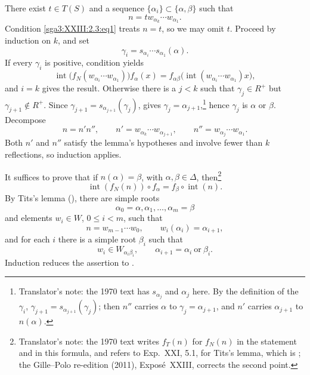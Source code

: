 There exist \(t\in T(S)\) and a sequence
\(\{\alpha_i\}\subset\{\alpha,\beta\}\) such that
\[
  n=tw_{\alpha_k}\cdots w_{\alpha_1}.
\]
Condition \eqref{sga3:XXIII:2.3:eq1} treats \(n=t\), so we may omit
\(t\). Proceed by induction on \(k\), and set
\[
  \gamma_i=s_{\alpha_i}\cdots s_{\alpha_1}(\alpha).
\]
If every \(\gamma_i\) is positive, condition  yields
\[
  \operatorname{int}\bigl(f_N(w_{\alpha_i}\cdots w_{\alpha_1})\bigr)
     f_\alpha(x)
   =
  f_{\alpha\beta}\bigl(
     \operatorname{int}(w_{\alpha_i}\cdots w_{\alpha_1})x\bigr),
\]
and \(i=k\) gives the result. Otherwise there is a \(j<k\) such that
\(\gamma_j\in R^+\) but \(\gamma_{j+1}\notin R^+\). Since
\(\gamma_{j+1}=s_{\alpha_{j+1}}(\gamma_j)\),  gives
\(\gamma_j=\alpha_{j+1}\),\footnote{Translator's note: the 1970 text has \(s_{\alpha_j}\) and
\(\alpha_j\) here. By the definition of the \(\gamma_i\),
\(\gamma_{j+1}=s_{\alpha_{j+1}}(\gamma_j)\); then \(n''\) carries \(\alpha\) to
\(\gamma_j=\alpha_{j+1}\), and \(n'\) carries \(\alpha_{j+1}\) to \(n(\alpha)\).} hence
\(\gamma_j\) is \(\alpha\) or \(\beta\).
Decompose
\[
 n=n'n'',\qquad
 n'=w_{\alpha_k}\cdots w_{\alpha_{j+1}},\qquad
 n''=w_{\alpha_j}\cdots w_{\alpha_1}.
\]
Both \(n'\) and \(n''\) satisfy the lemma's hypotheses and involve
fewer than \(k\) reflections, so induction applies.


It suffices to prove that if \(n(\alpha)=\beta\), with
\(\alpha,\beta\in\Delta\), then\footnote{Translator's note: the 1970 text writes \(f_T(n)\) for
\(f_N(n)\) in the statement and in this formula, and refers to Exp.~XXI, 5.1, for
Tits's lemma, which is ; the Gille--Polo
re-edition (2011), Exposé~XXIII, corrects the second point.}
\[
  \operatorname{int}(f_N(n))\circ f_\alpha
    =f_\beta\circ\operatorname{int}(n).
\]
By Tits's lemma (), there are simple roots
\[
  \alpha_0=\alpha,\alpha_1,\ldots,\alpha_m=\beta
\]
and elements \(w_i\in W\), \(0\leq i<m\), such that
\[
  n=w_{m-1}\cdots w_0,\qquad
  w_i(\alpha_i)=\alpha_{i+1},
\]
and for each \(i\) there is a simple root \(\beta_i\) such that
\[
  w_i\in W_{\alpha_i\beta_i},\qquad
  \alpha_{i+1}=\alpha_i\ \text{or}\ \beta_i.
\]
Induction reduces the assertion to .

